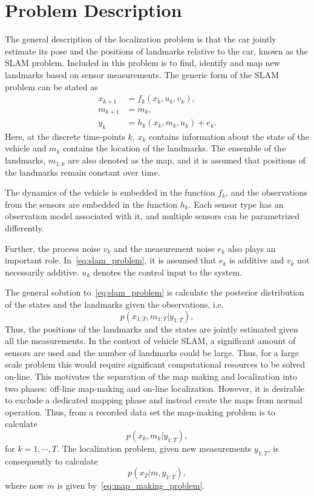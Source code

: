 \section{Problem Description}


The general description of the localization problem is that the car
jointly estimate its pose and the positions of landmarks relative to
the car, known as the \gls{SLAM} problem. Included in this problem is
to find, identify and map new landmarks based on sensor
measurements. The generic form of the \gls{SLAM} problem can be stated
as
\begin{subequations}\label{eq:slam_problem}
  \begin{align}
    x_{k+1} & = f_k(x_k, u_k,v_k), \\
    m_{k+1} & = m_k, \\
    y_k & = h_k(x_k, m_k, u_k) + e_k.
  \end{align}
\end{subequations}
Here, at the discrete time-points $k$, $x_k$ contains information about
the state of the vehicle and $m_k$ contains the location of the
landmarks. The ensemble of the landmarks, $m_{1:k}$ are also denoted as the map,
and it is assumed that positions of the landmarks remain constant over
time.

The dynamics of the vehicle is embedded in the function $f_k$, and the observations from the sensors are embedded in the function $h_k$. Each sensor type has an observation model associated with it, and multiple sensors can be parametrized differently.

Further, the process noise $v_k$ and the measurement noise $e_k$ also plays an important role. In~\eqref{eq:slam_problem}, it is assumed that $e_k$ is additive and $v_k$ not necessarily additive. $u_k$ denotes the control input to the system.

The general solution to~\eqref{eq:slam_problem} is calculate the posterior distribution of the states and the landmarks given the observations, i.e.
\begin{equation}\label{eq:posterior}
p(x_{1:T}, m_{1:T} | y_{1:T}),
\end{equation}
Thus, the positions of the landmarks and the states are jointly
estimated given all the measurements. In the context of vehicle \gls{SLAM}, a significant amount of sensors are used and the number of landmarks could be large. Thus, for a large scale problem this would require significant computational resources to be solved on-line. This motivates the separation of the map making and
localization into two phases: off-line map-making and on-line localization. However, it is desirable to exclude a dedicated mapping phase and instead create the maps from normal operation. Thus, from a recorded data set the map-making problem is to calculate
\begin{equation}\label{eq:map_making_problem}
p(x_{k}, m_{k} | y_{1:T}),
\end{equation}
for $k = 1, \cdots, T$. The localization problem, given new measurements $y_{1:T}$, is consequently to calculate
$$
p(x_{T}| m ,  y_{1:T}),
$$
where now $m$ is given by~\eqref{eq:map_making_problem}.

